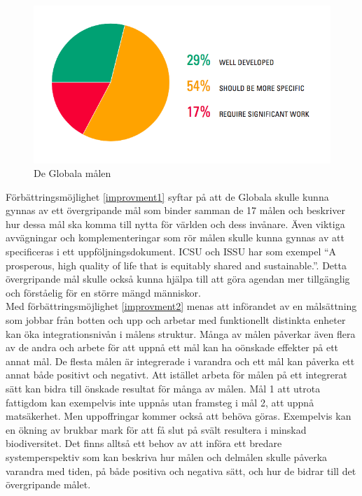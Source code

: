 \documentclass{report}
\begin{document}
\begin{figure}[h] \label{fig1}
\label{improvments}
\includegraphics[width=\linewidth]{improvments.png}
\caption{De Globala målen \cite{review}} 
\end{figure}

Förbättringsmöjlighet \ref{improvment1} syftar på att de Globala skulle kunna gynnas av ett övergripande mål som binder samman de 17 målen och beskriver hur dessa mål ska komma till nytta för världen och dess invånare. Även viktiga avvägningar och komplementeringar som rör målen skulle kunna gynnas av att specificeras i ett uppföljningsdokument. ICSU och ISSU har som exempel “A prosperous, high quality of life that is equitably shared and sustainable.”. Detta övergripande mål skulle också kunna hjälpa till att göra agendan mer tillgänglig och förståelig för en större mängd människor. \cite{C}\\

Med förbättringsmöjlighet \ref{improvment2} menas att införandet av en målsättning som jobbar från botten och upp och arbetar med funktionellt distinkta enheter kan öka integrationsnivån i målens struktur.\cite{Weitz}
Många av målen påverkar även flera av de andra och arbete för att uppnå ett mål kan ha oönskade effekter på ett annat mål. De flesta målen är integrerade i varandra och ett mål kan påverka ett annat både positivt och negativt. Att istället arbeta för målen på ett integrerat sätt kan bidra till önskade resultat för många av målen. Mål 1 att utrota fattigdom kan exempelvis inte uppnås utan framsteg i mål 2, att uppnå matsäkerhet. Men uppoffringar kommer också att behöva göras. Exempelvis kan en ökning av brukbar mark för att få slut på svält resultera i minskad biodiversitet. Det finns alltså ett behov av att införa ett bredare systemperspektiv som kan beskriva hur målen och delmålen skulle påverka varandra med tiden, på både positiva och negativa sätt, och hur de bidrar till det övergripande målet. \cite{review}\\
\end{document}
